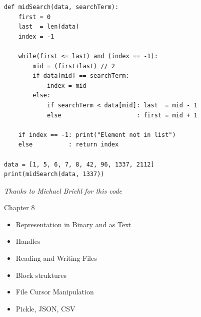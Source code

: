 \begin{frame}[fragile]
%
\begin{codebox}
\begin{verbatim}
def midSearch(data, searchTerm):
    first = 0
    last  = len(data)
    index = -1
    
    while(first <= last) and (index == -1):
        mid = (first+last) // 2
        if data[mid] == searchTerm:
            index = mid
        else:
            if searchTerm < data[mid]: last  = mid - 1
            else                     : first = mid + 1

    if index == -1: print("Element not in list")
    else          : return index

data = [1, 5, 6, 7, 8, 42, 96, 1337, 2112]
print(midSearch(data, 1337))
\end{verbatim}
\end{codebox}
%
\begin{flushright}
\scriptsize \emph{Thanks to Michael Briehl for this code}
\end{flushright}
%
\end{frame}


\begin{frame}[fragile]{Chapter 8}
%
\begin{itemize}
\item Representation in Binary and as Text
\item Handles
\item Reading and Writing Files
\item Block struktures
\item File Cursor Manipulation
\item Pickle, JSON, CSV
\end{itemize}
%
\end{frame}


